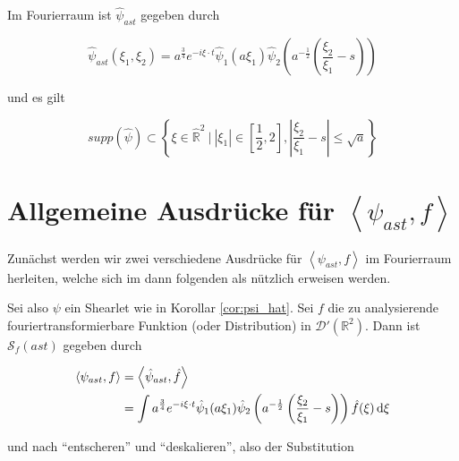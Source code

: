 \documentclass{scrartcl}
\begin{document}
\begin{remark}
\label{cor:psi_hat}
Im Fourierraum ist $\hat{\psi}_{ast}$ gegeben durch

\begin{equation}
    \hat \psi_{ast}{(\xi_1, \xi_2)} = a^{\frac{3}{4}}e^{-i\xi \cdot t}\hat\psi_1(a \xi_1) \hat\psi_{2}\left(a^{-\frac{1}{2}}\left(\frac{\xi_2}{\xi_1}-s\right)\right)
\end{equation}

und es gilt

\begin{equation}
\label{eq:supp_psi}
    supp(\hat \psi) \subset \left\{\xi \in  \hat{\mathbb{R}}^2 ~\Big| ~|\xi_1| \in \left[\frac{1}{2} , 2\right], \left|\frac{\xi_2}{\xi_1} - s\right| \leq \sqrt{a} \right\}
\end{equation}

\end{remark}


\section{Allgemeine Ausdrücke für $\left<\psi_{ast}, f\right>$}
\label{sec:<psi_ast,f>}

Zunächst werden wir zwei verschiedene Ausdrücke für $\left<\psi_{ast}, f\right>$
im Fourierraum herleiten, welche sich im dann folgenden als nützlich erweisen werden.

Sei also $\psi$ ein Shearlet wie in Korollar \ref{cor:psi_hat}. Sei $f$ die zu
analysierende fouriertransformierbare Funktion (oder Distribution) in
$\mathcal{D} \prime (\mathbb{R}^2)$. Dann ist $\mathcal{S}_f (ast)$ gegeben durch

\begin{align*}
\left< \psi_{ast}, f \right> &= \left<\hat\psi_{ast}, \hat f\right> \\
 &= \int a^\frac{3}{4} e^{-i \xi \cdot t} \hat \psi_1(a \xi_1)
    \hat \psi_2 \left(a^{-\frac{1}{2}} \left(\frac{\xi_2}{\xi_1} - s\right)\right)
    \hat f (\xi) \mathop{}\!\mathrm{d} \xi
\end{align*}

und nach "`entscheren"' und "`deskalieren"', also der Substitution
\end{document}
